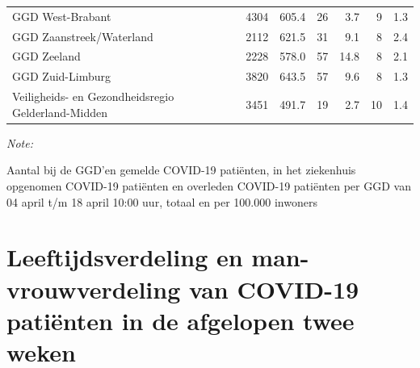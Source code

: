\documentclass[
  english,
  man,floatsintext]{apa6}
\begin{document}
\begin{table}
\begin{threeparttable}
\begin{tabular}{lrrrrrr}
GGD West-Brabant & 4304 & 605.4 & 26 & 3.7 & 9 & 1.3\\
GGD Zaanstreek/Waterland & 2112 & 621.5 & 31 & 9.1 & 8 & 2.4\\
GGD Zeeland & 2228 & 578.0 & 57 & 14.8 & 8 & 2.1\\
GGD Zuid-Limburg & 3820 & 643.5 & 57 & 9.6 & 8 & 1.3\\
Veiligheids- en Gezondheidsregio Gelderland-Midden & 3451 & 491.7 & 19 & 2.7 & 10 & 1.4\\
\bottomrule
\end{tabular}
\begin{tablenotes}
\item \textit{Note: } 
\item Aantal bij de GGD’en gemelde COVID-19 patiënten, in het ziekenhuis opgenomen COVID-19 patiënten en overleden COVID-19 patiënten per GGD van 04 april t/m 18 april 10:00 uur, totaal en per 100.000 inwoners
\end{tablenotes}
\end{threeparttable}
\endgroup{}
\end{table}

\newpage

\hypertarget{leeftijdsverdeling-en-man-vrouwverdeling-van-covid-19-patiuxebnten-in-de-afgelopen-twee-weken}{%
\section{Leeftijdsverdeling en man-vrouwverdeling van COVID-19 patiënten in de afgelopen twee weken}\label{leeftijdsverdeling-en-man-vrouwverdeling-van-covid-19-patiuxebnten-in-de-afgelopen-twee-weken}}
\end{document}
